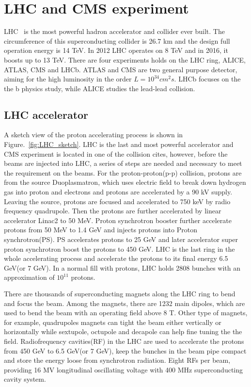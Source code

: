 \chapter{LHC and CMS experiment}

LHC~\cite{LHC_refer} is the most powerful hadron accelerator and collider ever built. The circumference of this superconducting collider is 26.7 km and the design full operation energy is 14 TeV. In 2012 LHC operates on 8 TeV and in 2016, it boosts up to 13 TeV. There are four experiments holds on the LHC ring, ALICE, ATLAS, CMS and LHCb. ATLAS and CMS are two general purpose detector, aiming for the high luminosity in the order $L=10^{34} cm^{2}s$. LHCb focuses on the the b physics study, while ALICE studies the lead-lead collision.

\section{LHC accelerator}

A sketch view of the proton accelerating process is shown in Figure.~\ref{fig:LHC_sketch}. LHC is the last and most powerful accelerator and CMS experiment is located in one of the collision cites, however, before the beams are injected into LHC, a series of steps are needed and necessary to meet the requirement on the beams. For the proton-proton(p-p) collision, protons are from the source Duoplasmatron, which uses electric field to break down hydrogen gas into proton and electrons and protons are accelerated by a 90 kV supply. Leaving the source, protons are focused and accelerated to 750 keV by radio frequency quadrupole. Then the protons are further accelerated by linear accelerator Linac2 to 50 MeV. Proton synchrotron booster further accelerate protons from 50 MeV to 1.4 GeV and injects protons into Proton synchrotron(PS). PS accelerates protons to 25 GeV and later accelerator super proton synchrotron boost the protons to 450 GeV. LHC is the last ring in the whole accelerating process and accelerate the protons to its final energy 6.5 GeV(or 7 GeV). In a normal fill with protons, LHC holds 2808 bunches with an approximation of $10^{11}$ protons.

There are thousands of superconducting magnets along the LHC ring to bend and focus the beam. Among the magnets, there are 1232 main dipoles, which are used to bend the beam with an operating field above 8 T. Other type of magnets, for example, quadrupoles magnets can tight the beam either vertically or horizontally while  sextupole, octupole and decapole can help fine tuning the the field. Radiofrequency cavities(RF) in the LHC are used to accelerate the protons from 450 GeV to 6.5 GeV(or 7 GeV), keep the bunches in the beam pipe compact and store the energy loose from synchrotron radiation. Eight RFs per beam, providing 16 MV  longitudinal oscillating voltage with 400 MHz superconducting cavity system. 

